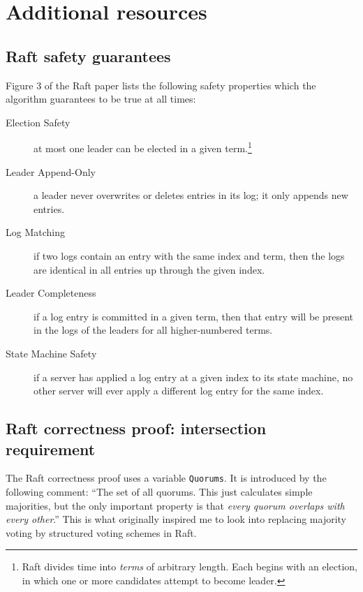 \documentclass[11pt,chapterprefix=true,toc=bibliography,numbers=noendperiod,
               footnotes=multiple,twoside]{scrreprt}
\begin{document}
\appendix



\chapter{Additional resources}

\section{Raft safety guarantees\label{sc:rafter-safety}}

Figure 3 of the Raft paper lists the following safety properties which the algorithm guarantees to be true at all times:\autocite{raft}

\begin{description}
    \item[Election Safety] at most one leader can be elected in a given term.\footnote{Raft divides time into \emph{terms} of arbitrary length. Each begins with an election, in which one or more candidates attempt to become leader.}
    \item[Leader Append-Only] a leader never overwrites or deletes entries in its log; it only appends new entries.
    \item[Log Matching] if two logs contain an entry with the same index and term, then the logs are identical in all entries up through the given index.
    \item[Leader Completeness] if a log entry is committed in a given term, then that entry will be present in the logs of the leaders for all higher-numbered terms.
    \item[State Machine Safety] if a server has applied a log entry at a given index to its state machine, no other server will ever apply a different log entry for the same index.
\end{description}

\section{Raft correctness proof: intersection requirement\label{sc:rafter-proof}}

The Raft correctness proof uses a variable \texttt{Quorums}. It is introduced by the following comment: \enquote{The set of all quorums. This just calculates simple majorities, but the only important property is that \emph{every quorum overlaps with every other}.} This is what originally inspired me to look into replacing majority voting by structured voting schemes in Raft.
\end{document}
